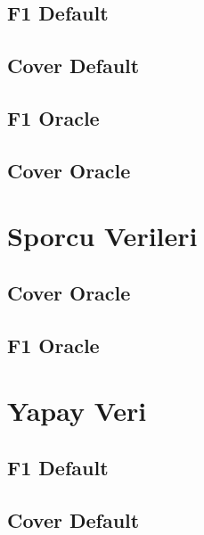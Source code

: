 \documentclass[12pt,twoside]{deuthesis}
\begin{document}
\hypertarget{f1-default}{%
\subsection{F1 Default}\label{f1-default}}

\hypertarget{cover-default}{%
\subsection{Cover Default}\label{cover-default}}

\hypertarget{f1-oracle}{%
\subsection{F1 Oracle}\label{f1-oracle}}

\hypertarget{cover-oracle}{%
\subsection{Cover Oracle}\label{cover-oracle}}

\hypertarget{sporcu-verileri}{%
\section{Sporcu Verileri}\label{sporcu-verileri}}

\hypertarget{cover-oracle-1}{%
\subsection{Cover Oracle}\label{cover-oracle-1}}

\hypertarget{f1-oracle-1}{%
\subsection{F1 Oracle}\label{f1-oracle-1}}

\hypertarget{yapay-veri-1}{%
\section{Yapay Veri}\label{yapay-veri-1}}

\hypertarget{f1-default-1}{%
\subsection{F1 Default}\label{f1-default-1}}

\hypertarget{cover-default-1}{%
\subsection{Cover Default}\label{cover-default-1}}
\end{document}
